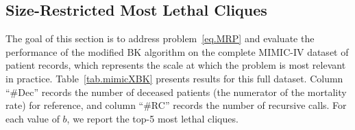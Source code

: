 \subsection{Size-Restricted Most Lethal Cliques}\label{sec.exp2-BKscalability}

The goal of this section is to address problem~\eqref{eq.MRP} and evaluate the performance of the
modified BK algorithm on the complete MIMIC-IV dataset of
 patient records, which represents the scale at which
the problem is most relevant in practice. Table~\ref{tab.mimicXBK}
presents results for this full dataset. Column ``\#Dec'' records the
number of deceased patients (the numerator of the mortality rate) for
reference, and column ``\#RC'' records the number of recursive calls.
For each value of $b$, we report the top-5 most lethal cliques.

